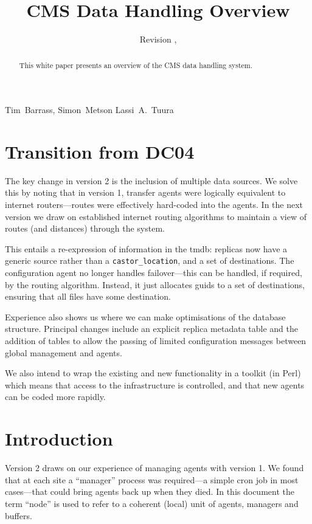 \documentclass{cmspaper}
\begin{document}
\begin{titlepage}
  \whitepaper
  \date{Revision \RCSRevision, \RCSDate}
  \title{CMS Data Handling Overview}

  \begin{Authlist}
    Tim~Barrass, Simon~Metson
    Lassi~A.~Tuura
  \end{Authlist}

  \begin{abstract}
    This white paper presents an overview of the CMS data handling system.
  \end{abstract} 

\end{titlepage}

\setcounter{page}{2}

\section{Transition from DC04}

The key change in version 2 is the inclusion of multiple data sources.
We solve this by noting that in version 1, transfer agents were
logically equivalent to internet routers---routes were effectively
hard-coded into the agents.  In the next version we draw on
established internet routing algorithms to maintain a view of routes
(and distances) through the system.

This entails a re-expression of information in the tmdb: replicas now
have a generic source rather than a \verb|castor_location|, and a set
of destinations.  The configuration agent no longer handles
failover---this can be handled, if required, by the routing algorithm.
Instead, it just allocates guids to a set of destinations, ensuring
that all files have some destination.

Experience also shows us where we can make optimisations of the
database structure.  Principal changes include an explicit replica
metadata table and the addition of tables to allow the passing of
limited configuration messages between global management and agents.

We also intend to wrap the existing and new functionality in a toolkit
(in Perl) which means that access to the infrastructure is controlled,
and that new agents can be coded more rapidly.

\section{Introduction}
Version 2 draws on our experience of managing agents with version 1.
We found that at each site a ``manager'' process was required---a
simple cron job in most cases---that could bring agents back up when
they died.  In this document the term ``node'' is used to refer to a
coherent (local) unit of agents, managers and buffers.
\end{document}
